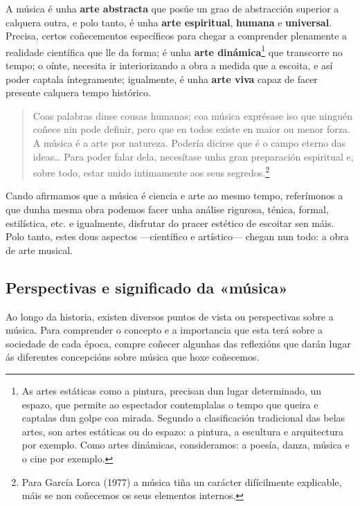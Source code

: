 \documentclass[a4paper, twoside]{templates/ociamthesis}
\begin{document}
A música é unha \textbf{arte abstracta} que posúe un grao de abstracción superior a calquera outra, e polo tanto, é unha \textbf{arte espiritual}, \textbf{humana} e \textbf{universal}. Precisa, certos coñecementos específicos para chegar a comprender plenamente a realidade científica que lle da forma; é unha \textbf{arte dinámica}\footnote{As artes estáticas como a pintura, precisan dun lugar determinado, un espazo, que permite ao espectador contemplalas o tempo que queira e captalas dun golpe coa mirada. Segundo a clasificación tradicional das belas artes, son artes estáticas ou do espazo: a pintura, a escultura e arquitectura por exemplo. Como artes dinámicas, consideramos: a poesía, danza, música e o cine por exemplo.} que transcorre no tempo; o oínte, necesita ir interiorizando a obra a medida que a escoita, e así poder captala íntegramente; igualmente, é unha \textbf{arte viva} capaz de facer presente calquera tempo histórico.

\begin{quote}
Coas palabras dinse cousas humanas; coa música exprésase iso que ninguén coñece nin pode definir, pero que en todos existe en maior ou menor forza. A música é a arte por natureza. Podería dicirse que é o campo eterno das ideas\ldots{} Para poder falar dela, necesítase unha gran preparación espiritual e, sobre todo, estar unido intimamente aos seus segredos.\footnote{Para García Lorca (1977) a música tiña un carácter difícilmente explicable, máis se non coñecemos os seus elementos internos.}
\end{quote}

Cando afirmamos que a música é ciencia e arte ao mesmo tempo, referímonos a que dunha mesma obra podemos facer unha análise rigurosa, ténica, formal, estilística, etc. e igualmente, disfrutar do pracer estético de escoitar sen máis. Polo tanto, estes dous aspectos ---científico e artístico--- chegan nun todo: a obra de arte musical.

\hypertarget{perspectivas-e-significado-da-muxfasica}{%
\subsection*{Perspectivas e significado da «música»}\label{perspectivas-e-significado-da-muxfasica}}

Ao longo da historia, existen diversos puntos de vista ou perspectivas sobre a música. Para comprender o concepto e a importancia que esta terá sobre a sociedade de cada época, compre coñecer algunhas das reflexións que darán lugar ás diferentes concepcións sobre música que hoxe coñecemos.
\end{document}
